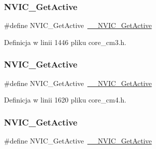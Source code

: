\subsubsection{\texorpdfstring{N\+V\+I\+C\+\_\+\+Get\+Active}{NVIC\_GetActive}\hspace{0.1cm}{\footnotesize\ttfamily [4/8]}}
{\footnotesize\ttfamily \#define N\+V\+I\+C\+\_\+\+Get\+Active~\hyperlink{group___c_m_s_i_s___core___n_v_i_c_functions_gaa2837003c28c45abf193fe5e8d27f593}{\+\_\+\+\_\+\+N\+V\+I\+C\+\_\+\+Get\+Active}}



Definicja w linii 1446 pliku core\+\_\+cm3.\+h.

\mbox{\label{group___c_m_s_i_s___core___n_v_i_c_functions_ga58ad3f352f832235ab3b192ff4745320}} 
\subsubsection{\texorpdfstring{N\+V\+I\+C\+\_\+\+Get\+Active}{NVIC\_GetActive}\hspace{0.1cm}{\footnotesize\ttfamily [5/8]}}
{\footnotesize\ttfamily \#define N\+V\+I\+C\+\_\+\+Get\+Active~\hyperlink{group___c_m_s_i_s___core___n_v_i_c_functions_gaa2837003c28c45abf193fe5e8d27f593}{\+\_\+\+\_\+\+N\+V\+I\+C\+\_\+\+Get\+Active}}



Definicja w linii 1620 pliku core\+\_\+cm4.\+h.

\mbox{\label{group___c_m_s_i_s___core___n_v_i_c_functions_ga58ad3f352f832235ab3b192ff4745320}} 
\subsubsection{\texorpdfstring{N\+V\+I\+C\+\_\+\+Get\+Active}{NVIC\_GetActive}\hspace{0.1cm}{\footnotesize\ttfamily [6/8]}}
{\footnotesize\ttfamily \#define N\+V\+I\+C\+\_\+\+Get\+Active~\hyperlink{group___c_m_s_i_s___core___n_v_i_c_functions_gaa2837003c28c45abf193fe5e8d27f593}{\+\_\+\+\_\+\+N\+V\+I\+C\+\_\+\+Get\+Active}}



